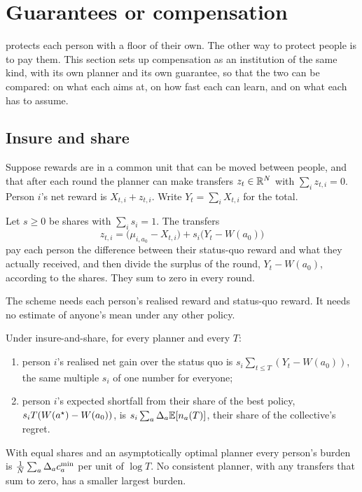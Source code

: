 \section{Guarantees or compensation}\label{sec:comp}

 protects each person with a floor of their own. The other way to protect people is to pay them. This section sets up compensation as an institution of the same kind, with its own planner and its own guarantee, so that the two can be compared: on what each aims at, on how fast each can learn, and on what each has to assume.

\subsection{Insure and share}

Suppose rewards are in a common unit that can be moved between people, and that after each round the planner can make transfers $z_t\in\mathbb{R}^N$ with $\sum_iz_{t,i}=0$. Person $i$'s net reward is $X_{t,i}+z_{t,i}$. Write $Y_t=\sum_iX_{t,i}$ for the total.

\begin{definition}\label{def:insure}
Let $s\ge0$ be shares with $\sum_is_i=1$. The transfers
\[
  z_{t,i}=\big(\mu_{i,a_0}-X_{t,i}\big)+s_i\big(Y_t-W(a_0)\big)
\]
pay each person the difference between their status-quo reward and what they actually received, and then divide the surplus of the round, $Y_t-W(a_0)$, according to the shares. They sum to zero in every round.
\end{definition}

The scheme needs each person's realised reward and status-quo reward. It needs no estimate of anyone's mean under any other policy.

\begin{proposition}\label{prop:insure}
Under insure-and-share, for every planner and every $T$:
\begin{enumerate}[leftmargin=*,itemsep=1pt,label=(\alph*)]
  \item person $i$'s realised net gain over the status quo is $s_i\sum_{t\le T}(Y_t-W(a_0))$, the same multiple $s_i$ of one number for everyone;
  \item person $i$'s expected shortfall from their share of the best policy, $s_iT(W(a^\star)-W(a_0))$, is $s_i\sum_a\Delta_a\mathbb{E}[n_a(T)]$, their share of the collective's regret.
\end{enumerate}
With equal shares and an asymptotically optimal planner every person's burden is $\frac1N\sum_a\Delta_ac^{\min}_a$ per unit of $\log T$. No consistent planner, with any transfers that sum to zero, has a smaller largest burden.
\end{proposition}

